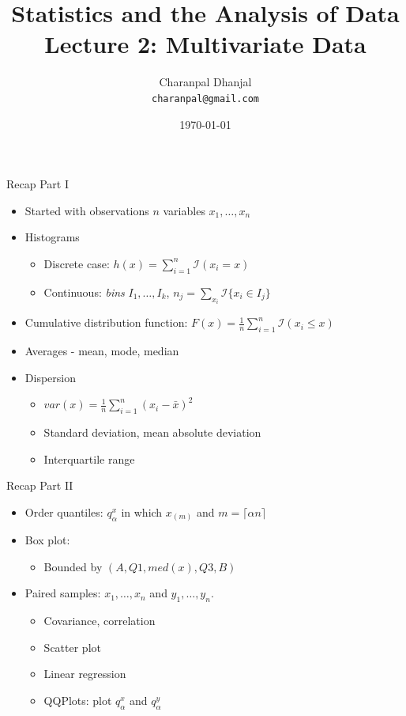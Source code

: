 \documentclass{beamer}
\title{Statistics and the Analysis of Data\\ Lecture 2: Multivariate Data}
\author{Charanpal Dhanjal \\ \texttt{charanpal@gmail.com}}
\institute{\'{E}cole des Ponts}
\date{\today}
\begin{document}
\frame{\titlepage}

\begin{frame}{Recap Part I}  
\begin{itemize} 
 \item Started with observations $n$ variables $x_1, \ldots, x_n$ 
 \item Histograms 
 \begin{itemize}
   \item Discrete case: $h(x) = \sum_{i=1}^n \mathcal{I}(x_i = x)$
 \item Continuous: \emph{bins} $ I_1, \ldots, I_k$, $n_j = \sum_{x_i} \mathcal{I}\{x_i \in I_j\}$
 \end{itemize} 
 \item Cumulative distribution function: $F(x) = \frac{1}{n}\sum_{i=1}^n \mathcal{I}(x_i \leq x)$
 \item Averages - mean, mode, median 
 \item Dispersion 
 \begin{itemize}
 \item $var(x) = \frac{1}{n}\sum_{i=1}^n (x_i - \bar{x})^2$
 \item Standard deviation, mean absolute deviation
 \item Interquartile range
 \end{itemize}
\end{itemize}
\end{frame}

\begin{frame}{Recap Part II}  
 \begin{itemize} 
  \item Order quantiles: $q_\alpha^x$ in which $x_{(m)}$ and $m = \lceil \alpha n \rceil$
  \item Box plot: 
  \begin{itemize} 
  \item Bounded by $(A, Q1, med(x), Q3, B)$ 
  \end{itemize}
  \item Paired samples: $x_1, \ldots, x_n$ and $y_1, \ldots, y_n$. 
   \begin{itemize}
   \item Covariance, correlation 
   \item Scatter plot 
   \item Linear regression 
   \item QQPlots: plot $q_\alpha^x$ and $q_\alpha^y$
   \end{itemize}
  \end{itemize}
\end{frame}
\end{document}

